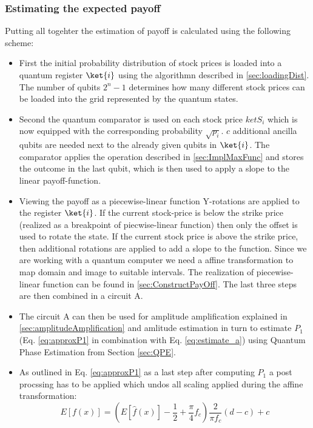 \documentclass[../../main.tex]{subfiles}
\begin{document}
\subsubsection{Estimating the expected payoff}
Putting all togehter the estimation of payoff is calculated using the following scheme:
\begin{itemize}
  \item First the initial probability distribution of stock prices is loaded into a quantum register $\ket{i}$ using
  the algorithmn described in \ref{sec:loadingDist}. The number of qubits $2^n-1$ determines how many different stock prices can be loaded into the grid represented by the quantum states.
  \item Second the quantum comparator is used on each stock price $ket{S_i}$ which is now equipped with the corresponding probability $\sqrt{p_i}$. $c$ additional ancilla qubits are needed next to the already given qubits in $\ket{i}$.
  The comparator applies the operation described in \ref{sec:ImplMaxFunc} and stores the outcome in the last qubit, which is then used to apply a slope to the linear payoff-function.
  \item Viewing the payoff as a piecewise-linear function Y-rotations are applied to the register $\ket{i}$. If the current stock-price is below the strike price (realized as a breakpoint of piecwise-linear function)
  then only the offset is used to rotate the state. If the current stock price is above the strike price, then additional rotations are applied to add a slope to the function. Since we are working with a quantum computer we need a affine transformation
  to map domain and image to suitable intervals. The realization of piecewise-linear function can be found in \ref{sec:ConstructPayOff}. The last three steps are then combined in a circuit A.
  \item The circuit A can then be used for amplitude amplification explained in \ref{sec:amplitudeAmplification} and amlitude estimation in turn to estimate $P_1$ (Eq. \ref{eq:approxP1} in combination with Eq. \ref{eq:estimate_a}) using Quantum Phase Estimation from Section \ref{sec:QPE}.
  \item As outlined in Eq. \ref{eq:approxP1} as a last step after computing $P_1$ a post procssing has to be applied which undos all scaling applied during the affine transformation: 
  \begin{equation}
     E[f(x)]  = ( E[\hat{f}(x)] - \frac{1}{2} + \frac{\pi}{4}f_c ) \frac{2}{\pi f_c} (d-c) + c
  \end{equation}
\end{itemize}
\biblio
\end{document}
